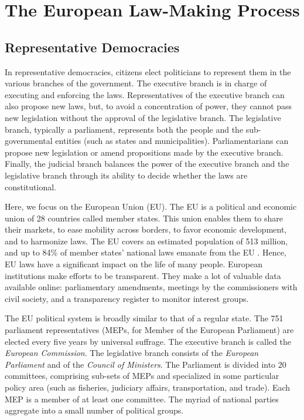 \section{The European Law-Making Process}
\label{lmp:sec:background}

\subsection{Representative Democracies}

In representative democracies, citizens elect politicians to represent them in the various branches of the government.
The executive branch is in charge of executing and enforcing the laws.
Representatives of the executive branch can also propose new laws, but, to avoid a concentration of power, they cannot pass new legislation without the approval of the legislative branch.
The legislative branch, typically a parliament, represents both the people and the sub-governmental entities (such as states and municipalities).
Parliamentarians  can propose new legislation or amend propositions made by the executive branch.
Finally, the judicial branch balances the power of the executive branch and the legislative branch through its ability to decide whether the laws are constitutional.

Here, we focus on the European Union (EU).
The EU is a political and economic union of 28 countries called member states.
This union enables them to share their markets, to ease mobility across borders, to favor economic development, and to harmonize laws.
The EU covers an estimated population of 513 million, and up to 84\% of member states' national laws emanate from the EU \cite{miller2010much}.
Hence, EU laws have a significant impact on the life of many people.
European institutions make efforts to be transparent.
They make a lot of valuable data available online: parliamentary amendments, meetings by the commissioners with civil society, and a transparency register to monitor interest groups.

The EU political system is broadly similar to that of a regular state.
The 751 parliament representatives (MEPs, for Member of the European Parliament) are elected every five years by universal suffrage.
The executive branch is called the \textit{European Commission}.
The legislative branch consists of the \textit{European Parliament} and of the \textit{Council of Ministers}.
The Parliament is divided into 20 committees, comprising sub-sets of MEPs and specialized in some particular policy area (such as fisheries, judiciary affairs, transportation, and trade).
Each MEP is a member of at least one committee.
The myriad of national parties aggregate into a small number of political groups.

